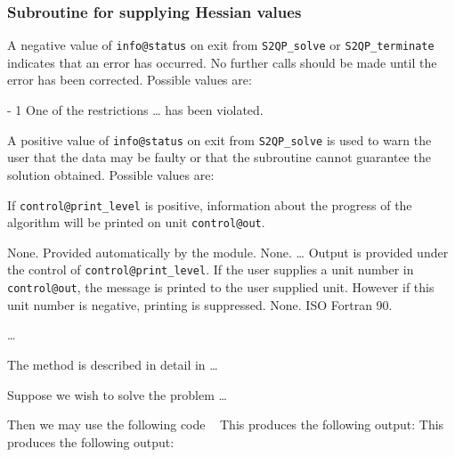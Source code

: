 \documentclass{galahad}
\newcommand{\packagename}{S2QP}
\begin{document}

\subsubsection{Subroutine for supplying Hessian values}\label{H}


\galreverse


\galerrors
A negative value of {\tt info@status} on exit from
{\tt \packagename\_solve}
or
{\tt \packagename\_terminate}
indicates that an error has occurred. No further calls should be made
until the error has been corrected. Possible values are:

\begin{description}
\item{- 1 } One of the restrictions \ldots
          has been violated.
\end{description}
A positive value of {\tt info@status} on exit from
{\tt \packagename\_solve}
is used to warn the user that the data may be faulty or that
the subroutine cannot guarantee the solution obtained.
Possible values are:



\galinfo
If {\tt control@print\_level} is positive, information about the progress
of the algorithm will be printed on unit {\tt control@out}.


\galgeneral

\galcommon None.
\galworkspace Provided automatically by the module.
\galroutines None.
\galmodules \ldots
\galio Output is provided under the control of {\tt control@print\_level}.
     If the user supplies a unit number in {\tt control@out}, the message
     is printed to the user supplied unit. However if this unit
     number is negative, printing is suppressed.
\galrestrictions None.
\galportability ISO Fortran 90.


\galmethod
\ldots

\galreference
The method is described in detail in \ldots


\galexample
Suppose we wish to solve the problem \ldots

\noindent
Then we may use the following code
{\tt \small
\VerbatimInput{\packageexample}
}
\noindent
This produces the following output:
This produces the following output:
{\tt \small
\VerbatimInput{\packageresults}
}
\noindent
\end{document}
